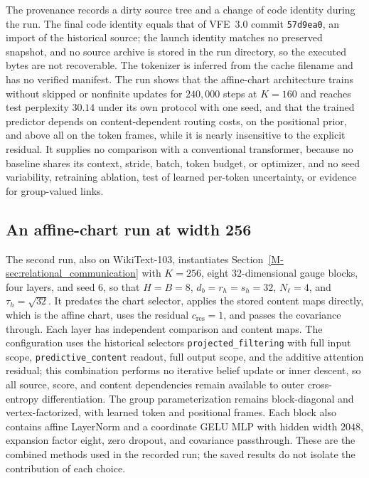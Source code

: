 \documentclass[twoside,11pt]{article}
\begin{document}
The provenance records a dirty source tree and a change of code identity during the run. The final code identity equals that of VFE~3.0 commit \texttt{57d9ea0}, an import of the historical source; the launch identity matches no preserved snapshot, and no source archive is stored in the run directory, so the executed bytes are not recoverable. The tokenizer is inferred from the cache filename and has no verified manifest. The run shows that the affine-chart architecture trains without skipped or nonfinite updates for $240{,}000$ steps at $K=160$ and reaches test perplexity $30.14$ under its own protocol with one seed, and that the trained predictor depends on content-dependent routing costs, on the positional prior, and above all on the token frames, while it is nearly insensitive to the explicit residual. It supplies no comparison with a conventional transformer, because no baseline shares its context, stride, batch, token budget, or optimizer, and no seed variability, retraining ablation, test of learned per-token uncertainty, or evidence for group-valued links.

\subsection{An affine-chart run at width 256}
\label{supp:run_k256}

The second run, also on WikiText-103, instantiates Section~\ref{M-sec:relational_communication} with $K=256$, eight $32$-dimensional gauge blocks, four layers, and seed 6, so that $H=B=8$, $d_b=r_h=s_h=32$, $N_\ell=4$, and $\tau_h=\sqrt{32}$. It predates the chart selector, applies the stored content maps directly, which is the affine chart, uses the residual $c_{\mathrm{res}}=1$, and passes the covariance through. Each layer has independent comparison and content maps. The configuration uses the historical selectors \texttt{projected\_\allowbreak filtering} with full input scope, \texttt{predictive\_\allowbreak content} readout, full output scope, and the additive attention residual; this combination performs no iterative belief update or inner descent, so all source, score, and content dependencies remain available to outer cross-entropy differentiation. The group parameterization remains block-diagonal and vertex-factorized, with learned token and positional frames. Each block also contains affine LayerNorm and a coordinate GELU MLP with hidden width $2048$, expansion factor eight, zero dropout, and covariance passthrough. These are the combined methods used in the recorded run; the saved results do not isolate the contribution of each choice.
\end{document}
